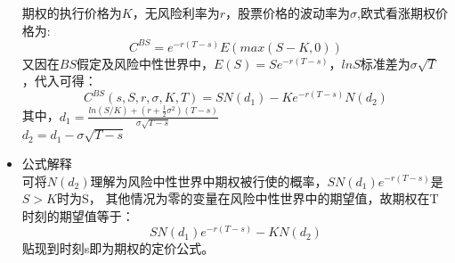 \documentclass{article}
\begin{document}
\begin{itemize}
	期权的执行价格为$K$，无风险利率为$r$，股票价格的波动率为$\sigma $,欧式看涨期权价格为:\\
	\[C^{BS}= e^{-r(T-s)}E(max(S-K,0))\]
	又因在$BS$假定及风险中性世界中，$ E(S)=Se^{-r(T-s)}$，$ lnS $标准差为$ \sigma\sqrt{T} $，代入可得：
	\[C^{BS}(s,S,r,\sigma,K,T) = SN(d_{1})-Ke^{-r(T-s)}N(d_{2})\]
	其中，$d_{1}=\frac{ln(S/K)+(r+\frac{1}{2}\sigma^{2})(T-s)}{\sigma\sqrt{T-s}}$\\
	$d_{2} = d_{1}-\sigma\sqrt{T-s}$
	\item 公式解释\\
	可将$ N(d_{2}) $理解为风险中性世界中期权被行使的概率，$ SN(d_{1})e^{-r(T-s)} $是$ S>K $时为S，
	其他情况为零的变量在风险中性世界中的期望值，故期权在T时刻的期望值等于：
	\[SN(d_{1})e^{-r(T-s)}-KN(d_{2})\]
	贴现到时刻s即为期权的定价公式。
\end{itemize}
\end{document}
